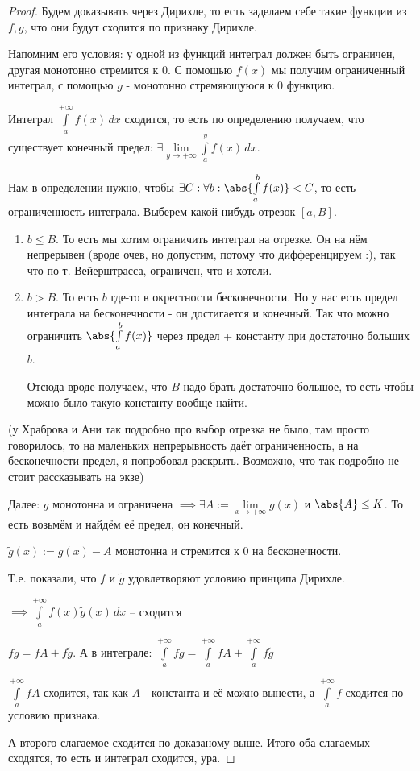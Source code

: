 \begin{proof}\slashns
	
	Будем доказывать через Дирихле, то есть заделаем себе такие функции из $f, g$, что они будут сходится по признаку Дирихле.

    Напомним его условия: у одной из функций интеграл должен быть ограничен, другая монотонно стремится к 0. С помощью $f(x)$ мы получим ограниченный интеграл, с помощью $g$ - монотонно стремяющуюся к 0 функцию.
	
    Интеграл $\int\limits_a^{+\infty} f(x)\,dx$ сходится, то есть по определению получаем, что существует конечный предел: $\exists \lim\limits_{y \to +\infty} \int\limits_a^y f(x)\, dx$. 

    Нам в определении нужно, чтобы $\exists C: \forall b: \abs{\int\limits_{a}^{b} f(x)} < C$, то есть ограниченность интеграла. Выберем какой-нибудь отрезок $[a, B]$.

    \begin{enumerate}
        \item $b \le B$. То есть мы хотим ограничить интеграл на отрезке. Он на нём непрерывен (вроде очев, но допустим, потому что дифференцируем :), так что по т. Вейерштрасса, ограничен, что и хотели.
        \item $b > B$. То есть $b$ где-то в окрестности бесконечности. Но у нас есть предел интеграла на бесконечности - он достигается и конечный. Так что можно ограничить $\abs{\int\limits_a^b f(x)}$ через предел + константу при достаточно больших $b$. 

            Отсюда вроде получаем, что $B$ надо брать достаточно большое, то есть чтобы можно было такую константу вообще найти.
    \end{enumerate}

    (у Храброва и Ани так подробно про выбор отрезка не было, там просто говорилось, то на маленьких непрерывность даёт ограниченность, а на бесконечности предел, я попробовал раскрыть. Возможно, что так подробно не стоит рассказывать на экзе)
	
    Далее:
    $g$ монотонна и ограничена $\implies \exists A:= \lim\limits_{x \to +\infty} g(x)$ и $\abs{A} \le K$. То есть возьмём и найдём её предел, он конечный.
	
	$\widetilde{g}(x) := g(x) - A$ монотонна и стремится к $0$ на бесконечности.
	
	Т.е. показали, что $f$ и $\widetilde{g}$ удовлетворяют условию принципа Дирихле.
	
	$\implies \int\limits_a^{+\infty} f(x) \widetilde{g}(x)\, dx$ -- сходится
	
	$fg = fA+f\widetilde{g}$. А в интеграле: $\int\limits_a^{+\infty} fg = \int\limits_a^{+\infty} fA + \int\limits_a^{+\infty} f\widetilde{g}$

    $\int\limits_a^{+\infty} fA$ сходится, так как $A$ - константа и её можно вынести, а $\int\limits_a^{+\infty} f$ сходится по условию признака.

    А второго слагаемое сходится по доказаному выше. Итого оба слагаемых сходятся, то есть и интеграл сходится, ура.
\end{proof}

